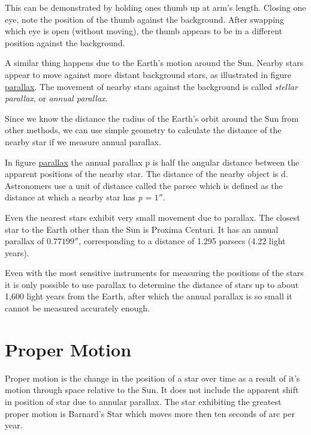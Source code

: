 This can be demonstrated by holding ones thumb up at arm's length.
Closing one eye, note the position of the thumb against the background.
After swapping which eye is open (without moving), the thumb appears to
be in a different position against the background.

A similar thing happens due to the Earth's motion around the Sun. Nearby
stars appear to move against more distant background stars, as
illustrated in figure \href{Astronomical_Concepts\#Parallax}{parallax}.
The movement of nearby stars against the background is called
\emph{stellar parallax}, or \emph{annual parallax}.

Since we know the distance the radius of the Earth's orbit around the
Sun from other methods, we can use simple geometry to calculate the
distance of the nearby star if we measure annual parallax.

In figure \href{Astronomical_Concepts\#Parallax}{parallax} the annual
parallax p is half the angular distance between the apparent positions
of the nearby star. The distance of the nearby object is d. Astronomers
use a unit of distance called the parsec which is defined as the
distance at which a nearby star has \emph{p} = $1''$.

Even the nearest stars exhibit very small movement due to parallax. The
closest star to the Earth other than the Sun is Proxima Centuri. It has
an annual parallax of $0.77199''$, corresponding to a distance of 1.295
parsecs (4.22 light years).

Even with the most sensitive instruments for measuring the positions of
the stars it is only possible to use parallax to determine the distance
of stars up to about 1,600 light years from the Earth, after which the
annual parallax is so small it cannot be measured accurately enough.

\section{Proper Motion}\label{proper-motion}

Proper motion is the change in the position of a star over time as a
result of it's motion through space relative to the Sun. It does not
include the apparent shift in position of star due to annular parallax.
The star exhibiting the greatest proper motion is Barnard's Star which
moves more then ten seconds of arc per year.



